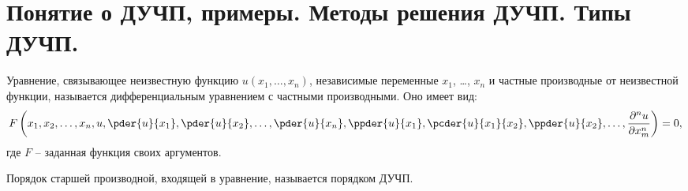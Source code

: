 \chapter{Понятие о ДУЧП, примеры. Методы решения ДУЧП. Типы ДУЧП.}

Уравнение, связывающее неизвестную функцию \( u(x_1, \ldots, x_n) \), независимые
переменные \( x_1 \), \ldots, \( x_n \) и частные производные от неизвестной
функции, называется дифференциальным уравнением с частными производными. Оно
имеет вид:
\[
    F\left(x_1, x_2, \ldots, x_n, u, \pder{u}{x_1}, \pder{u}{x_2}, \ldots,
    \pder{u}{x_n}, \ppder{u}{x_1}, \pcder{u}{x_1}{x_2}, \ppder{u}{x_2}, \ldots,
    \pnder{n}{u}{x_m}\right) = 0,
\]
где \( F \) -- заданная функция своих аргументов.

Порядок старшей производной, входящей в уравнение, называется порядком ДУЧП.

